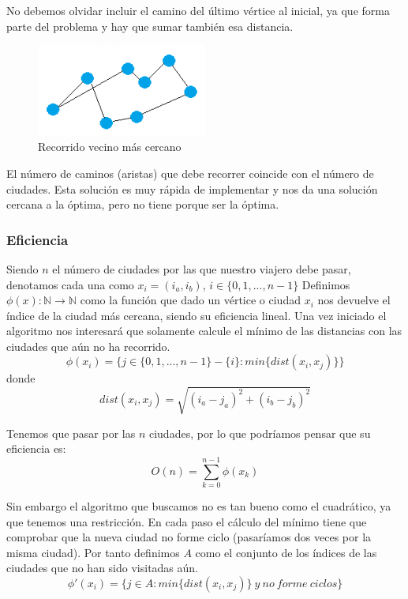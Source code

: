 No debemos olvidar incluir el camino del último vértice al inicial, ya que forma parte del problema y hay que sumar también esa distancia.

\begin{figure}[htbH] 
	\centering
	\includegraphics[width=0.5\textwidth]{./Imagenes/vecino8.png}
	\caption{Recorrido vecino más cercano} 
\end{figure}

El número de caminos (aristas) que debe recorrer coincide con el número de ciudades.
Esta solución es muy rápida de implementar y nos da una solución cercana a la óptima, pero no tiene porque ser la óptima.

\newpage


\newpage
\subsubsection{Eficiencia}
Siendo $n$ el número de ciudades por las que nuestro viajero debe pasar, denotamos cada una como $x_i=(i_a, i_b)$, $i\in\{0,1,...,n-1\}$
Definimos $\phi (x):\mathbb{N} \rightarrow \mathbb{N}$ como la función que dado un vértice o ciudad $x_i$ nos devuelve el 
índice de la ciudad más cercana, siendo su eficiencia lineal. Una vez iniciado el algoritmo nos interesará que solamente calcule
el mínimo de las distancias con las ciudades que aún no ha recorrido.
\[\phi (x_i) = \{j \in\{0,1,...,n-1\}-\{i\} : min\{dist(x_i, x_j)\} \}\]
donde 
\[ dist(x_i, x_j) = \sqrt{(i_a-j_a)^2+(i_b-j_b)^2} \]

Tenemos que pasar por las $n$ ciudades, por lo que podríamos pensar que su eficiencia es:
\[O(n) = \sum_{k=0}^{n-1} \phi (x_k)  \]

Sin embargo el algoritmo que buscamos no es tan bueno como el cuadrático, ya que tenemos una restricción. En cada paso el cálculo
del mínimo tiene que comprobar que la nueva ciudad no forme ciclo (pasaríamos dos veces por la misma ciudad).
Por tanto definimos $A$ como el conjunto de los índices de las ciudades que no han sido visitadas aún.
\[\phi '(x_i) = \{j \in A : min\{dist(x_i, x_j)\} \ y \ no \ forme \ ciclos \}\]

